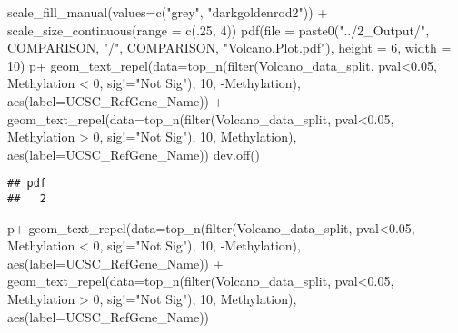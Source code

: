 \documentclass[
  10pt,
]{article}
\newenvironment{Shaded}{\begin{snugshade}}{\end{snugshade}}
\newcommand{\AttributeTok}[1]{\textcolor[rgb]{0.77,0.63,0.00}{#1}}
\newcommand{\DecValTok}[1]{\textcolor[rgb]{0.00,0.00,0.81}{#1}}
\newcommand{\FloatTok}[1]{\textcolor[rgb]{0.00,0.00,0.81}{#1}}
\newcommand{\FunctionTok}[1]{\textcolor[rgb]{0.00,0.00,0.00}{#1}}
\newcommand{\NormalTok}[1]{#1}
\newcommand{\SpecialCharTok}[1]{\textcolor[rgb]{0.00,0.00,0.00}{#1}}
\newcommand{\StringTok}[1]{\textcolor[rgb]{0.31,0.60,0.02}{#1}}
\begin{document}
\begin{Shaded}
\begin{Highlighting}[]
  \FunctionTok{scale\_fill\_manual}\NormalTok{(}\AttributeTok{values=}\FunctionTok{c}\NormalTok{(}\StringTok{"grey"}\NormalTok{, }\StringTok{"darkgoldenrod2"}\NormalTok{)) }\SpecialCharTok{+}
  \FunctionTok{scale\_size\_continuous}\NormalTok{(}\AttributeTok{range =} \FunctionTok{c}\NormalTok{(.}\DecValTok{25}\NormalTok{, }\DecValTok{4}\NormalTok{))}
\FunctionTok{pdf}\NormalTok{(}\AttributeTok{file =} \FunctionTok{paste0}\NormalTok{(}\StringTok{"../2\_Output/"}\NormalTok{, COMPARISON, }\StringTok{"/"}\NormalTok{, COMPARISON, }\StringTok{"Volcano.Plot.pdf"}\NormalTok{), }\AttributeTok{height =} \DecValTok{6}\NormalTok{, }\AttributeTok{width =} \DecValTok{10}\NormalTok{)}
\NormalTok{p}\SpecialCharTok{+}
  \FunctionTok{geom\_text\_repel}\NormalTok{(}\AttributeTok{data=}\FunctionTok{top\_n}\NormalTok{(}\FunctionTok{filter}\NormalTok{(Volcano\_data\_split, pval}\SpecialCharTok{\textless{}}\FloatTok{0.05}\NormalTok{, Methylation }\SpecialCharTok{\textless{}} \DecValTok{0}\NormalTok{, sig}\SpecialCharTok{!=}\StringTok{"Not Sig"}\NormalTok{), }\DecValTok{10}\NormalTok{, }\SpecialCharTok{{-}}\NormalTok{Methylation), }\FunctionTok{aes}\NormalTok{(}\AttributeTok{label=}\NormalTok{UCSC\_RefGene\_Name)) }\SpecialCharTok{+}
  \FunctionTok{geom\_text\_repel}\NormalTok{(}\AttributeTok{data=}\FunctionTok{top\_n}\NormalTok{(}\FunctionTok{filter}\NormalTok{(Volcano\_data\_split, pval}\SpecialCharTok{\textless{}}\FloatTok{0.05}\NormalTok{, Methylation }\SpecialCharTok{\textgreater{}} \DecValTok{0}\NormalTok{, sig}\SpecialCharTok{!=}\StringTok{"Not Sig"}\NormalTok{), }\DecValTok{10}\NormalTok{, Methylation), }\FunctionTok{aes}\NormalTok{(}\AttributeTok{label=}\NormalTok{UCSC\_RefGene\_Name))}
\FunctionTok{dev.off}\NormalTok{()}
\end{Highlighting}
\end{Shaded}

\begin{verbatim}
## pdf 
##   2
\end{verbatim}

\begin{Shaded}
\begin{Highlighting}[]
\NormalTok{p}\SpecialCharTok{+}
  \FunctionTok{geom\_text\_repel}\NormalTok{(}\AttributeTok{data=}\FunctionTok{top\_n}\NormalTok{(}\FunctionTok{filter}\NormalTok{(Volcano\_data\_split, pval}\SpecialCharTok{\textless{}}\FloatTok{0.05}\NormalTok{, Methylation }\SpecialCharTok{\textless{}} \DecValTok{0}\NormalTok{, sig}\SpecialCharTok{!=}\StringTok{"Not Sig"}\NormalTok{), }\DecValTok{10}\NormalTok{, }\SpecialCharTok{{-}}\NormalTok{Methylation), }\FunctionTok{aes}\NormalTok{(}\AttributeTok{label=}\NormalTok{UCSC\_RefGene\_Name)) }\SpecialCharTok{+}
  \FunctionTok{geom\_text\_repel}\NormalTok{(}\AttributeTok{data=}\FunctionTok{top\_n}\NormalTok{(}\FunctionTok{filter}\NormalTok{(Volcano\_data\_split, pval}\SpecialCharTok{\textless{}}\FloatTok{0.05}\NormalTok{, Methylation }\SpecialCharTok{\textgreater{}} \DecValTok{0}\NormalTok{, sig}\SpecialCharTok{!=}\StringTok{"Not Sig"}\NormalTok{), }\DecValTok{10}\NormalTok{, Methylation), }\FunctionTok{aes}\NormalTok{(}\AttributeTok{label=}\NormalTok{UCSC\_RefGene\_Name))}
\end{Highlighting}
\end{Shaded}
\end{document}
